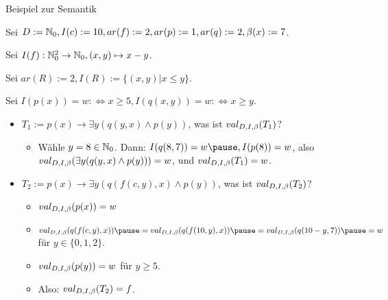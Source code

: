 \begin{frame}{Beispiel zur Semantik}
	
	Sei $D := \mathbb{N}_0, I(c) := 10, ar(f) := 2, ar(p) := 1, ar(q) := 2, \beta(x) := 7$.
	
	Sei $I(f) : \mathbb{N}_0^2 \rightarrow \mathbb{N}_0, (x,y) \mapsto x-y$.
	
	Sei $ar(R) := 2, I(R) := \{(x,y) | x \leq y\}$.
	
	Sei $I(p(x)) = w :\Leftrightarrow x \geq 5, I(q(x,y)) = w :\Leftrightarrow x \geq y$.
	
	\begin{itemize}
		\item $T_1 := p(x) \rightarrow \exists y (q(y,x) \land p(y))$, was ist $val_{D,I,\beta}(T_1)$?
		
		\pause
		\begin{itemize}
			\item Wähle $y = 8 \in \mathbb{N}_0$. \ip Dann: $I(q(8,7)) = w\ip, I(p(8)) = w$\ip, also $val_{D,I,\beta}(\exists y (q(y,x) \land p(y))) = w$\ip, und $val_{D,I,\beta}(T_1) = w$.
		\end{itemize}
		
		\pause
		
		\item $T_2 := p(x) \rightarrow \exists y (q(f(c,y), x) \land p(y))$, was ist $val_{D,I,\beta}(T_2)$?
		
		\pause
		\begin{itemize}
			\item $val_{D,I,\beta}(p(x)) = w$
			\ip\item $\pval(q(f(c,y), x)) \ip = \pval(q(f(10,y), x))\ip = \pval(q(10-y, 7))\ip = w$ für $y \in \{0,1,2\}$.
			\ip\item $val_{D,I,\beta}(p(y)) = w$ für $y \geq 5$.
			\ip\item Also: $val_{D,I,\beta}(T_2) = f$.
		\end{itemize}
	\end{itemize}
\end{frame}

